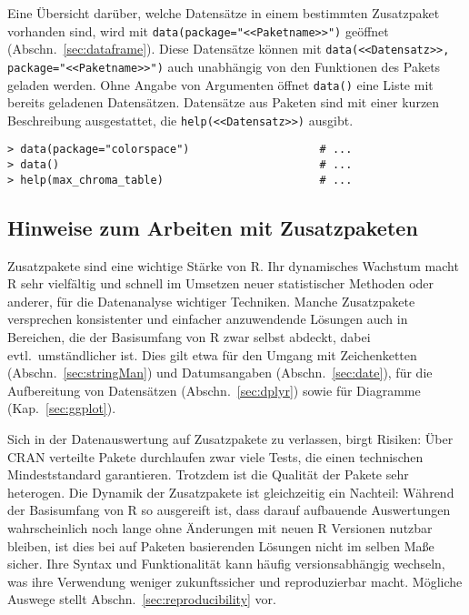 Eine Übersicht darüber, welche Datensätze in einem bestimmten Zusatzpaket vorhanden sind, wird mit \lstinline!data(package="<<Paketname>>")! geöffnet (Abschn.\ \ref{sec:dataframe}). Diese Datensätze können mit \lstinline!data(<<Datensatz>>, package="<<Paketname>>")! auch unabhängig von den Funktionen des Pakets geladen werden. Ohne Angabe von Argumenten öffnet \lstinline!data()! eine Liste mit bereits geladenen Datensätzen. Datensätze aus Paketen sind mit einer kurzen Beschreibung ausgestattet, die \lstinline!help(<<Datensatz>>)! ausgibt.
\begin{lstlisting}
> data(package="colorspace")                    # ...
> data()                                        # ...
> help(max_chroma_table)                        # ...
\end{lstlisting}

\subsection{Hinweise zum Arbeiten mit Zusatzpaketen}
\label{sec:packages_cave}

Zusatzpakete sind eine wichtige Stärke von R. Ihr dynamisches Wachstum macht R sehr vielfältig und schnell im Umsetzen neuer statistischer Methoden oder anderer, für die Datenanalyse wichtiger Techniken. Manche Zusatzpakete versprechen konsistenter und einfacher anzuwendende Lösungen auch in Bereichen, die der Basisumfang von R zwar selbst abdeckt, dabei evtl.\ umständlicher ist. Dies gilt etwa für den Umgang mit Zeichenketten (Abschn.\ \ref{sec:stringMan}) und Datumsangaben (Abschn.\ \ref{sec:date}), für die Aufbereitung von Datensätzen (Abschn.\ \ref{sec:dplyr}) sowie für Diagramme (Kap.\ \ref{sec:ggplot}).

Sich in der Datenauswertung auf Zusatzpakete zu verlassen, birgt Risiken: Über CRAN verteilte Pakete durchlaufen zwar viele Tests, die einen technischen Mindeststandard garantieren. Trotzdem ist die Qualität der Pakete sehr heterogen. Die Dynamik der Zusatzpakete ist gleichzeitig ein Nachteil: Während der Basisumfang von R so ausgereift ist, dass darauf aufbauende Auswertungen wahrscheinlich noch lange ohne Änderungen mit neuen R Versionen nutzbar bleiben, ist dies bei auf Paketen basierenden Lösungen nicht im selben Maße sicher. Ihre Syntax und Funktionalität kann häufig versionsabhängig wechseln, was ihre Verwendung weniger zukunftssicher und reproduzierbar macht. Mögliche Auswege stellt Abschn.\ \ref{sec:reproducibility} vor.

